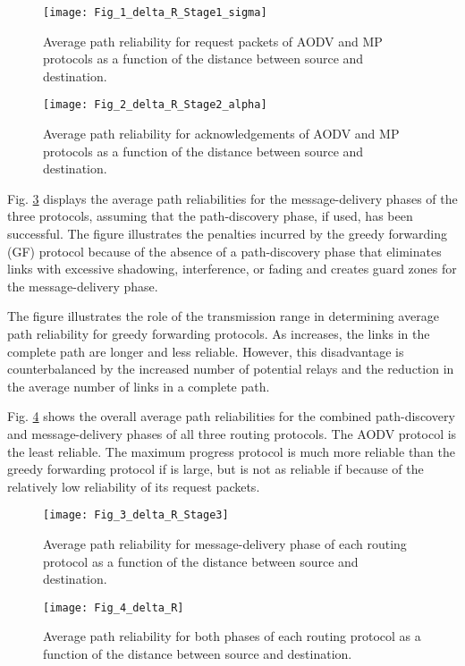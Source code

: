 \documentclass[conference]{IEEEtran}
\begin{document}
\begin{figure}[tb]\centering
\texttt{[image: Fig\_1\_delta\_R\_Stage1\_sigma]}\caption{Average path reliability for request packets of AODV and MP protocols as a function of the distance between source and destination.} \label{Fig.1}
\end{figure}


\begin{figure}[tb]\centering
\texttt{[image: Fig\_2\_delta\_R\_Stage2\_alpha]}\caption{Average path reliability for acknowledgements of AODV and MP protocols as a function of the distance between source and destination.} \label{Fig.2}
\end{figure}


Fig. \ref{Fig.3} displays the average path reliabilities for
the message-delivery phases of the three protocols, assuming that the path-discovery phase, if used, has been
successful. The figure illustrates the penalties incurred
by the greedy forwarding (GF) protocol because of
the absence of a path-discovery phase that eliminates
links with excessive shadowing, interference, or fading
and creates guard zones for the message-delivery phase.

The figure illustrates the role of the transmission range
 in determining average path reliability for greedy
forwarding protocols. As  increases, the links in the
complete path are longer and less reliable. However, this
disadvantage is counterbalanced by the increased number
of potential relays and the reduction in the average
number of links in a complete path.


Fig. \ref{Fig.4} shows the overall average path reliabilities
for the combined path-discovery and message-delivery
phases of all three routing protocols. The AODV protocol
is the least reliable. The maximum progress protocol is
much more reliable than the greedy forwarding protocol
if 
is large, but is not as reliable if 
because of the relatively low reliability of its request packets.

\begin{figure}[tb]\centering
\texttt{[image: Fig\_3\_delta\_R\_Stage3]}\caption{Average path reliability for message-delivery phase of each routing
protocol as a function of the distance between source and destination.} \label{Fig.3}
\end{figure}

\begin{figure}[tb]\centering
\texttt{[image: Fig\_4\_delta\_R]}\caption{Average path reliability for both phases of each routing protocol as a function of the distance between source and destination.} \label{Fig.4}
\end{figure}
\end{document}
